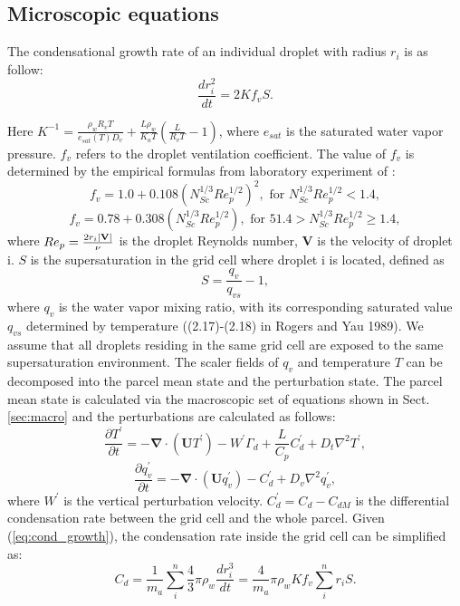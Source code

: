 \subsection{Microscopic equations}\label{sec:micro}
The condensational growth rate of an individual droplet with radius $r_i$ is as follow:
\begin{equation}\label{eq:cond_growth}
\frac{dr_i^2}{dt}=2Kf_vS.
\end{equation}

 Here $K^{-1}=\frac{\rho_wR_vT}{e_{sat}(T)D_v}+\frac{L\rho_w}{K_aT}(\frac{L}{R_vT}-1)$, where $e_{sat}$ is the saturated water vapor pressure. $f_v$ refers to the droplet ventilation coefficient. The value of $f_v$ is determined by the empirical formulas from laboratory experiment of \citet{Beard1971}:
\begin{equation}
f_v=1.0+0.108(N_{Sc}^{1/3}Re_p^{1/2})^2,\text{   for  $N_{Sc}^{1/3}Re_p^{1/2}<1.4$},
\end{equation}
\begin{equation}
f_v=0.78+0.308(N_{Sc}^{1/3} Re_p^{1/2} ),\text{  for $51.4>N_{Sc}^{1/3} Re_p^{1/2}\geq 1.4$},
\end{equation}
where $Re_p=\frac{2r_i|\bf{V}|}{\nu}$ is the droplet Reynolds number, $\mathbf{V}$ is the velocity of droplet i. $S$ is the supersaturation in the grid cell where droplet i is located, defined as 
\begin{equation}\label{eq:supersat}
S=\frac{q_v}{q_{vs}}-1,
\end{equation} 
where $q_v$ is the water vapor mixing ratio, with its corresponding saturated value $q_{vs}$ determined by temperature ((2.17)-(2.18) in Rogers and Yau 1989). We assume that all droplets residing in the same grid cell are exposed to the same supersaturation environment. The scaler fields of $q_v$ and temperature $T$ can be decomposed into the parcel mean state and the perturbation state. The parcel mean state is calculated via the macroscopic set of equations shown in Sect. \ref{sec:macro} and the perturbations are calculated as follows:
\begin{equation}\label{eq:temp}
\frac{\partial{T^\prime}}{\partial{t}} = -\mathbf{\nabla}\cdot(\mathbf{U}T^\prime)-W^\prime\Gamma_d + \frac{L}{C_p}C_d^\prime+D_t\nabla^2T^\prime,
\end{equation}
\begin{equation}\label{eq:qv}
\frac{\partial{q_v^\prime}}{\partial{t}} = -\mathbf{\nabla}\cdot(\mathbf{U}q_v^\prime)-C_d^\prime+D_v\nabla^2q_v^\prime,
\end{equation}
where $W^\prime$ is the vertical perturbation velocity. $C_d^\prime = C_d - C_{dM}$ is the differential condensation rate between the grid cell and the whole parcel. Given (\ref{eq:cond_growth}), the condensation rate inside the grid cell can be simplified as:
\begin{equation} \label{eq:C_d}
C_d= \frac{1}{m_a}\sum^n_i{\frac{4}{3}\pi\rho_w\frac{dr_i^3}{dt}}=\frac{4}{m_a}\pi\rho_wKf_v\sum^n_i{r_iS}.
\end{equation}

